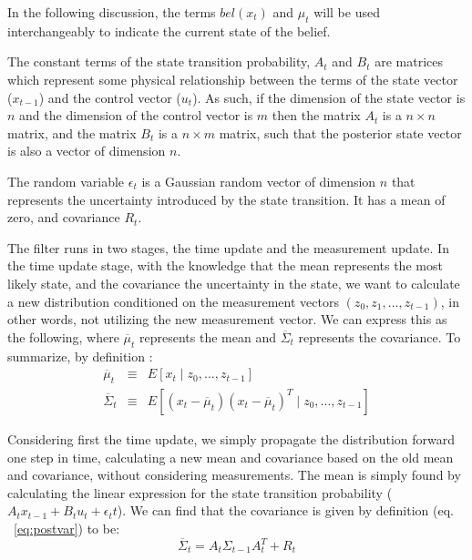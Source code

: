 \documentclass[english]{article}
\begin{document}
In the following discussion, the terms $bel(x_t)$ and $\mu_t$ will be used interchangeably to indicate the current state of the belief.

The constant terms of the state transition probability, $A_{t}$ and $B_{t}$ are matrices which represent some physical relationship between the terms of the state vector ($x_{t-1}$) and the control vector ($u_{t}$). As such, if the dimension of the state vector is $n$ and the dimension of the control vector is $m$ then the matrix $A_{t}$ is a $n \times n$ matrix, and the matrix $B_{t}$ is a $n \times m$ matrix, such that the posterior state vector is also a vector of dimension $n$. 

The random variable $\epsilon _{t}$ is a Gaussian random vector of dimension $n$ that represents the uncertainty introduced by the state transition. It has a mean of zero, and covariance $R_{t}$.

The filter runs in two stages, the time update and the measurement update. In the time update stage, with the knowledge that the mean represents the most likely state, and the covariance the uncertainty in the state, we want to calculate a new distribution conditioned on the measurement vectors $(z_0, z_1, ..., z_{t-1})$, in other words, not utilizing the new measurement vector. We can express this as the following, where $\overline{\mu}_{t}$ represents the mean and $\overline{\Sigma}_{t}$ represents the covariance. To summarize, by definition \cite{kalfilter}:
\begin{eqnarray}
\label{eq:postmean}
\overline{\mu}_{t} &\equiv& E\left[x_{t} \mid z_0,...,z_{t-1}\right] \\
\label{eq:postvar}
\overline{\Sigma}_{t} &\equiv& E\left[(x_{t} - \overline{\mu}_{t})(x_{t} - \overline{\mu}_{t})^T \mid z_0,...,z_{t-1}\right]
\end{eqnarray}

Considering first the time update, we simply propagate the distribution forward one step in time, calculating a new mean and covariance based on the old mean and covariance, without considering measurements. The mean is simply found by calculating the linear expression for the state transition probability ($A_{t} x_{t-1} + B_{t} u_{t} + \epsilon_{t}t$). We can find that the covariance is given by definition (eq. ~\ref{eq:postvar}) to be:
\begin{equation}
\overline{\Sigma}_{t} = A_{t} \Sigma_{t-1} A_{t}^T + R_{t}
\end{equation}
\end{document}
